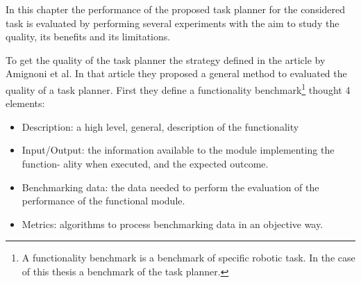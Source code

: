 \iffalse
In this chapter the performance of the proposed task planner for the considered task is evaluated by performing several experiments with the aim to study the quality, its benefits and its limitations.

To get the quality of the task planner the strategy defined in the article \citep{Benchmarking} by Amignoni et al. In that article they proposed a general method to evaluated the quality of a task planner. 
First they define a functionality benchmark\footnote{A functionality benchmark is a benchmark of specific robotic task. In the case of this thesis a benchmark of the task planner.} thought 4 elements:
\begin{itemize}
\item Description: a high level, general, description of the functionality
\item Input/Output: the information available to the module implementing the function-
ality when executed, and the expected outcome.
\item Benchmarking data: the data needed to perform the evaluation of the performance
of the functional module.
\item Metrics: algorithms to process benchmarking data in an objective way.
\end{itemize}

